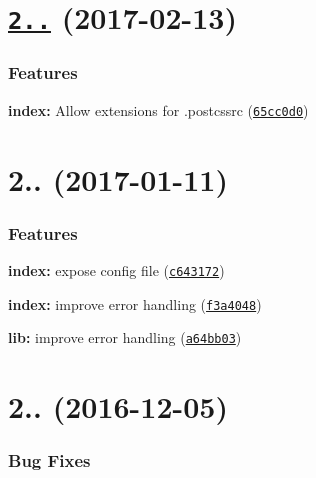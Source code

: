 \label{_2.3.0}%
 \section*{\href{https://github.com/michael-ciniawsky/postcss-load-plugins/compare/v2.2.0...v2.3.0}{\tt 2..} (2017-\/02-\/13)}

\subsubsection*{Features}


\begin{DoxyItemize}
\item {\bfseries index\+:} Allow extensions for .postcssrc (\href{https://github.com/michael-ciniawsky/postcss-load-plugins/commit/65cc0d0}{\tt 65cc0d0})
\end{DoxyItemize}

\label{_2.2.0}%
 \section*{2.. (2017-\/01-\/11)}

\subsubsection*{Features}


\begin{DoxyItemize}
\item {\bfseries index\+:} expose config file (\href{https://github.com/michael-ciniawsky/postcss-load-plugins/commit/c643172}{\tt c643172})
\item {\bfseries index\+:} improve error handling (\href{https://github.com/michael-ciniawsky/postcss-load-plugins/commit/f3a4048}{\tt f3a4048})
\item {\bfseries lib\+:} improve error handling (\href{https://github.com/michael-ciniawsky/postcss-load-plugins/commit/a64bb03}{\tt a64bb03})
\end{DoxyItemize}

\label{_2.1.0}%
 \section*{2.. (2016-\/12-\/05)}

\subsubsection*{Bug Fixes}


